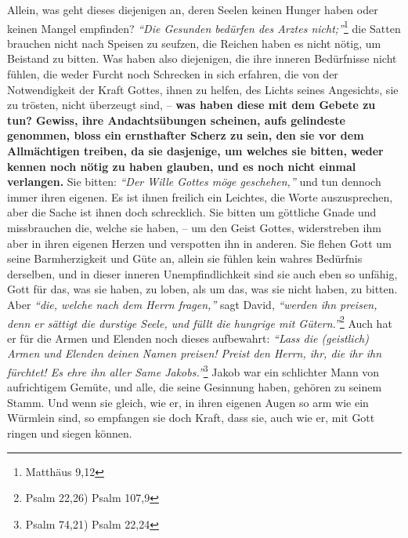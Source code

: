   Allein, was geht dieses
diejenigen an, deren Seelen keinen Hunger haben oder keinen Mangel empfinden?
\textit{"`Die Gesunden bedürfen des Arztes nicht;"'}\footnote{Matthäus 9,12}
die Satten brauchen nicht nach Speisen zu
seufzen, die Reichen haben es nicht nötig, um Beistand zu bitten. Was haben also
diejenigen, die ihre inneren Bedürfnisse  nicht
fühlen, die weder Furcht noch
Schrecken in sich erfahren, die von der Notwendigkeit der Kraft Gottes, ihnen
zu helfen, des Lichts seines Angesichts, sie zu trösten, nicht
überzeugt sind, \label{ref:06_07_sinnlose_gebete}
-- \textbf{was haben diese mit dem Gebete zu tun? Gewiss, ihre Andachtsübungen
scheinen, aufs gelindeste genommen, bloss ein ernsthafter Scherz zu sein, den
sie vor dem Allmächtigen treiben, da sie dasjenige, um welches sie bitten, weder
kennen noch nötig zu haben glauben, und es noch nicht einmal verlangen.} Sie
bitten:
\textit{"`Der Wille Gottes möge geschehen,"'}
und tun dennoch immer ihren
eigenen. Es ist ihnen freilich ein
Leichtes, die Worte auszusprechen, aber die
Sache ist ihnen doch schrecklich. Sie bitten um göttliche Gnade und
missbrauchen die, welche sie haben, -- um den Geist Gottes, widerstreben ihm
aber in ihren eigenen Herzen und verspotten ihn in anderen.
Sie flehen Gott um
seine Barmherzigkeit und Güte an, allein sie fühlen kein wahres Bedürfnis
derselben, und in dieser inneren Unempfindlichkeit sind sie auch eben so
unfähig, Gott für das, was sie haben, zu loben, als um das, was sie nicht haben,
zu bitten. Aber  \textit{"`die, welche nach dem Herrn fragen,"'} sagt David,
\textit{"`werden ihn preisen, denn er sättigt die durstige Seele, und füllt
die hungrige mit Gütern."'}\footnote{Psalm 22,26) Psalm 107,9}
Auch hat er für die Armen und Elenden
noch dieses aufbewahrt:
\textit{"`Lass die (geistlich) Armen und Elenden deinen
Namen
preisen! Preist den Herrn, ihr, die ihr ihn fürchtet! Es ehre ihn aller Same
Jakobs."'}\footnote{Psalm 74,21) Psalm 22,24}
Jakob war ein schlichter Mann von
aufrichtigem Gemüte, und alle, die seine Gesinnung haben, gehören zu seinem
Stamm. Und wenn sie gleich, wie er, in ihren eigenen Augen so arm wie ein
Würmlein sind, so empfangen sie doch Kraft, dass sie, auch wie er, mit Gott
ringen und siegen können.

